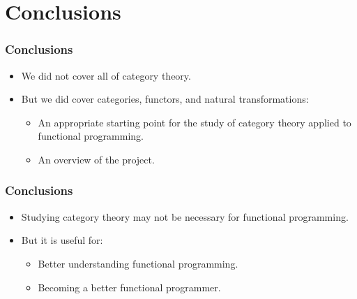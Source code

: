 \documentclass{beamer}
\begin{document}

\section{Conclusions}


\begin{frame}
  \frametitle{Conclusions}

  \begin{itemize}
  \item
    We did not cover all of category theory.
  \end{itemize}
  \begin{itemize}
  \item
    But we did cover categories, functors, and natural
    transformations:
    \begin{itemize}
    \item
      An appropriate starting point for the study of category theory
      applied to functional programming.
    \item
      An overview of the project.
    \end{itemize}
  \end{itemize}

\end{frame}


\begin{frame}
  \frametitle{Conclusions}

  \begin{itemize}
  \item
    Studying category theory may not be necessary for functional
    programming.
  \end{itemize}
  \begin{itemize}
  \item
    But it is useful for:
    \begin{itemize}
    \item
      Better understanding functional programming.
    \item
      Becoming a better functional programmer.
    \end{itemize}
  \end{itemize}

\end{frame}
\end{document}
